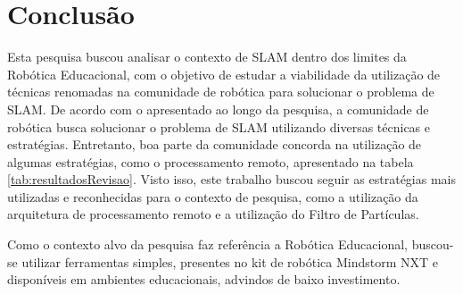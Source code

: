 \chapter[Conclusão]{Conclusão}

Esta pesquisa buscou analisar o contexto de SLAM dentro dos limites da Robótica Educacional, com o objetivo de estudar a
viabilidade da utilização de técnicas renomadas na comunidade de robótica para solucionar o problema de SLAM. De acordo com o apresentado ao
longo da pesquisa, a comunidade de robótica busca solucionar o problema de SLAM utilizando diversas
técnicas e estratégias. Entretanto, boa parte da comunidade concorda na utilização de algumas estratégias, como o processamento remoto,
apresentado na tabela \ref{tab:resultadosRevisao}. Visto isso, este trabalho buscou seguir as estratégias mais utilizadas e reconhecidas
 para o contexto de pesquisa, como a utilização da arquitetura de processamento remoto e a utilização do Filtro de Partículas.

Como o contexto alvo da pesquisa faz referência a Robótica Educacional, buscou-se utilizar ferramentas simples,
presentes no kit de robótica Mindstorm NXT e disponíveis em ambientes educacionais, advindos de baixo investimento.
